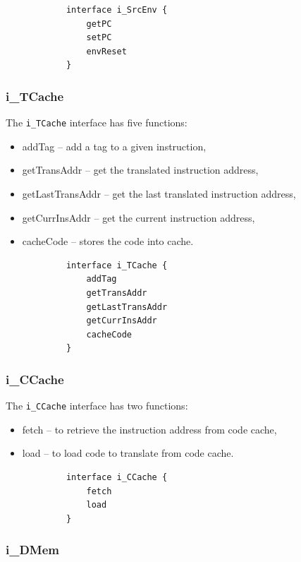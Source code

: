\documentclass{report}
\begin{document}
			\begin{lstlisting}
			interface i_SrcEnv {
				getPC
				setPC
				envReset
			}
			\end{lstlisting}
			
			\subsubsection*{i\_TCache}
			
			\par The \texttt{i\_TCache} interface has five functions:
			\begin{itemize}
				\item addTag -- add a tag to a given instruction,
				\item getTransAddr -- get the translated instruction address,
				\item getLastTransAddr -- get the last translated instruction address, 
				\item getCurrInsAddr -- get the current instruction address,
				\item cacheCode -- stores the code into cache.
			\end{itemize}
		
			\begin{lstlisting}
			interface i_TCache {
				addTag 			
				getTransAddr		
				getLastTransAddr 	
				getCurrInsAddr	
				cacheCode		
			}
			\end{lstlisting}
			
			\subsubsection*{i\_CCache}
			
			\par The \texttt{i\_CCache} interface has two functions:
			\begin{itemize}
				\item fetch -- to retrieve the instruction address from code cache,
				\item load -- to load code to translate from code cache.
			\end{itemize}
			
			\begin{lstlisting}
			interface i_CCache {
				fetch	
				load
			}
			\end{lstlisting}
			
			\subsubsection*{i\_DMem}
			
\end{document}
